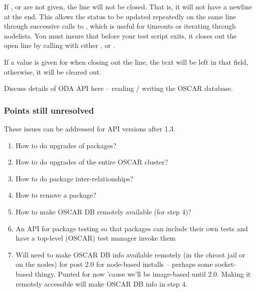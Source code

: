 If , or  are not given, the line will not be closed.
That is, it will not have a newline at the end. This allows the status
to be updated repeatedly on the same line through successive calls to
, which is useful for timeouts or iterating through nodelists. 
You must insure that before your test
script exits, it closes out the open line by calling  
with either , or . 

If a value is given for  when closing out the line, the text
will be left in that field, otherwise, it will be cleared out.

\begin{discuss}
  Discuss details of ODA API here -- reading / writing the OSCAR
  database.
\end{discuss}


\subsubsection{Points still unresolved}

These issues can be addressed for API versions after 1.3.

\begin{enumerate}
\item How to do upgrades of packages?
\item How to do upgrades of the entire OSCAR cluster?
\item How to do package inter-relationships?
\item How to remove a package?
\item How to make OSCAR DB remotely available (for step 4)?
\item An API for package testing so that packages can include their
  own tests and have a top-level (OSCAR) test manager invoke them
  
\item Will need to make OSCAR DB info available remotely (in the
  chroot jail or on the nodes) for post 2.0 for node-based installs --
  perhaps some socket-based thingy.  Punted for now 'cause we'll be
  image-based until 2.0.  Making it remotely accessible will make
  OSCAR DB info in step 4.
\end{enumerate}


